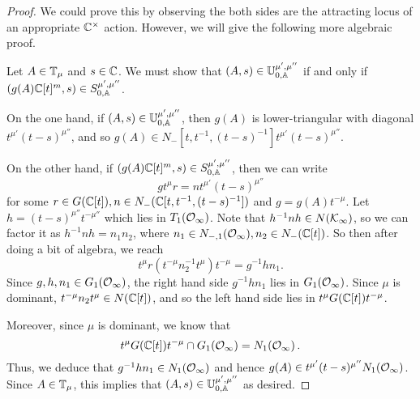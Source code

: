 \documentclass[draft]{article}
\begin{document}
\begin{proof}
We could prove this by observing the both sides are the attracting locus of an appropriate $ \mathbb C^\times$ action. However, we will give the following more algebraic proof.

Let $ A \in \mathbb T_\mu$ and $ s \in \mathbb C $. We must show that  $ (A,s) \in \mathbb U^{\mu', \mu''}_{0,\mathbb A} $ if and only if $ (g(A)\mathbb C[t]^m,s) \in S^{\mu', \mu''}_{0,\mathbb A} $. 

On the one hand, if $ (A,s) \in \mathbb U^{\mu', \mu''}_{0,\mathbb A} $, then $ g(A)$ is lower-triangular with diagonal $ t^{\mu'} (t-s)^{\mu''}$, and so $ g(A) \in N_-[t, t^{-1}, (t-s)^{-1}] t^{\mu'} (t-s)^{\mu''}$. 

On the other hand, if $ (g(A)\mathbb C[t]^m, s) \in S^{\mu', \mu''}_{0,\mathbb A}$, then we can write 
$$
    g t^\mu r= n t^{\mu'} (t-s)^{\mu''}
$$
for some $ r \in G(\mathbb C[t]), n \in N_-(\mathbb C[t, t^{-1}, (t-s)^{-1}]) $ and $ g = g(A)t^{-\mu}$.  Let $ h = (t-s)^{\mu''} t^{-\mu''}$ which lies in $ T_1(\mathcal O_\infty) $. %
Note that $ h^{-1}n h \in N(\mathcal K_\infty)$, 
so we can factor it as $ h^{-1} n h  = n_1 n_2 $, where $ n_1 \in N_{-,1}(\mathcal O_\infty), n_2 \in N_-(\mathbb C[t])$.  So then after doing a bit of algebra, we reach
$$
    t^\mu r (t^{-\mu} n_2^{-1} t^\mu) t^{-\mu} = g^{-1} h n_1.
$$
Since $ g, h, n_1 \in G_1(\mathcal O_\infty)$, the right hand side $ g^{-1} h n_1 $ lies in $ G_1(\mathcal O_\infty) $.  Since $ \mu $ is dominant, $ t^{-\mu} n_2 t^\mu \in N(\mathbb C[t])$, and so the left hand side lies in $t^\mu G(\mathbb C[t]) t^{-\mu}$.

Moreover, since $ \mu $ is dominant, we know that 
$$
    t^\mu G(\mathbb C[t]) t^{-\mu} \cap G_1(\mathcal O_\infty) = N_1(\mathcal O_\infty)\,.
$$
Thus, we deduce that $ g^{-1} h n_1 \in N_1(\mathcal O_\infty)$ 
and hence $ g(A) \in t^{\mu'} (t-s)^{\mu''} N_1(\mathcal O_\infty) $.  
Since $ A \in \mathbb T_\mu $, this implies that $ (A,s) \in \mathbb U^{\mu', \mu''}_{0,\mathbb A}$ as desired.
\end{proof}
% 
% 
\end{document}
